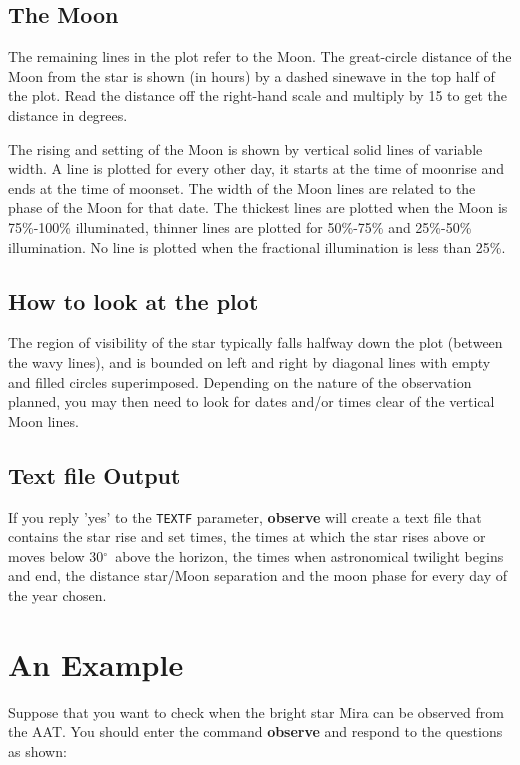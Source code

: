 \documentclass[11pt]{article}
\newcommand{\degrees}{\hbox{$^\circ$}}
\newcommand{\degrees}{{\rawhtml &deg;}}
\begin{document}
\subsection{The Moon}

The remaining lines in the plot refer to the Moon. The great-circle
distance of the Moon from the star is shown (in hours) by a dashed
sinewave in the top half of the plot. Read the distance off the
right-hand scale and multiply by 15 to get the distance in degrees.

The rising and setting of the Moon is shown by vertical solid lines of
variable width.  A line is plotted for every other day, it starts at
the time of moonrise and ends at the time of moonset.  The width of the
Moon lines are related to the phase of  the Moon for that date. The
thickest lines are plotted when the Moon is  75\%-100\% illuminated,
thinner lines are plotted for 50\%-75\% and 25\%-50\% illumination. No
line is plotted when the fractional illumination is less than  25\%.

\subsection{How to look at the plot}

The region of visibility of the star typically falls halfway down the
plot (between the wavy lines), and is bounded on left and right by
diagonal lines with empty and filled  circles superimposed. Depending
on the nature of the observation planned, you may then need  to look
for  dates and/or times clear of the vertical Moon lines.

\subsection{Text file Output}

If you reply 'yes' to the {\tt{TEXTF}} parameter, {\bf{observe}} will
create a text file that contains the star rise and set times, the times
at which the star rises above or moves below 30\degrees\ above the
horizon, the times when astronomical twilight begins and end, the
distance star/Moon separation and the moon phase for every day of the
year chosen.

\newpage
\section{An Example}

Suppose that you want to check when the bright star Mira can be
observed  from the AAT.  You should enter the command {\bf{observe}} and
respond to the questions as  shown:
\end{document}

